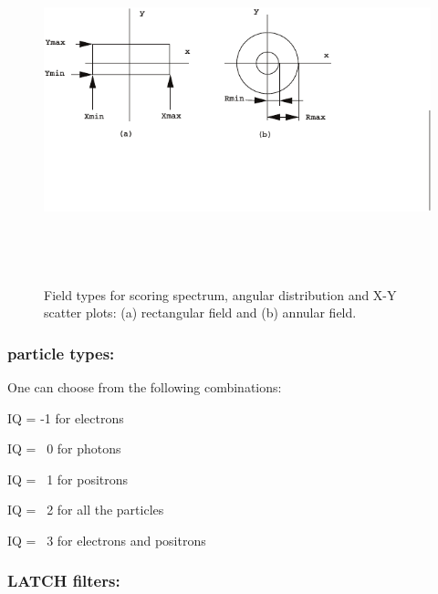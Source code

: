\documentclass[12pt,twoside]{article}
\begin{document}
\begin{figure}[htbp]
\begin{center}
\includegraphics[height=10cm]{figures/field-spe}
\caption[]
{Field types for scoring spectrum, angular distribution and X-Y scatter plots:
(a) rectangular field and (b) annular field. }
\label{fig-field-spe}
\end{center}
\end{figure}

\noindent
\subsubsection{particle types:}

\noindent
One can choose from the following combinations:


IQ = -1 for electrons

IQ = ~0 for photons

IQ = ~1 for positrons

IQ = ~2 for all the particles

IQ = ~3 for electrons and positrons

\noindent
\subsubsection{LATCH filters:}
\end{document}
